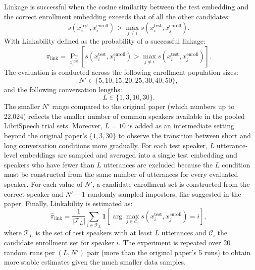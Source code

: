 \documentclass[12pt,leqno,a4paper]{article}
\begin{document}
Linkage is successful when the cosine similarity between the test embedding
and the correct enrollment embedding exceeds that of all the other candidates:
\begin{equation}
s(x_i^{\mathrm{test}}, x_i^{\mathrm{enroll}})
> \max_{j \neq i} s(x_i^{\mathrm{test}}, x_j^{\mathrm{enroll}}).
\end{equation}
With Linkability defined as the probability of a successful linkage:
\begin{equation}
\pi_{\mathrm{link}} = \Pr_{x_i^{\mathrm{test}}}
\left[
s(x_i^{\mathrm{test}}, x_i^{\mathrm{enroll}})
> \max_{j \neq i} s(x_i^{\mathrm{test}}, x_j^{\mathrm{enroll}})
\right].
\end{equation}
The evaluation is conducted across the following enrollment population sizes:
\begin{equation}
N' \in \{5, 10, 15, 20, 25, 30, 40, 50\},
\end{equation}
and the following conversation lengths:
\begin{equation}
L \in \{1, 3, 10, 30\}.
\end{equation}
The smaller $N'$ range compared to
the original paper (which numbers up to 22,024) reflects the smaller number of common
speakers available in the pooled LibriSpeech trial sets. Moreover, $L=10$
is added as an intermediate setting beyond the original paper's
$\{1, 3, 30\}$ to observe the transition between short and long
conversation conditions more gradually. For each test speaker, $L$
utterance-level embeddings are sampled and averaged
into a single test embedding and speakers who have fewer than $L$
utterances are excluded because the $L$ condition must be constructed from the same number of utterances for every evaluated speaker. For each value of $N'$, a candidate enrollment set
is constructed from the correct speaker and $N'-1$ randomly sampled
impostors, like suggested in the paper. Finally, Linkability is estimated as:
\begin{equation}
\widehat{\pi}_{\mathrm{link}}
= \frac{1}{|\mathcal{T}_L|}
\sum_{i \in \mathcal{T}_L}
\mathbf{1}
\left[
\arg\max_{j \in \mathcal{C}_i}
s(x_i^{\mathrm{test}}, x_j^{\mathrm{enroll}})
= i
\right],
\end{equation}
where $\mathcal{T}_L$ is the set of test speakers with at least $L$
utterances and $\mathcal{C}_i$ the candidate enrollment set for speaker
$i$. The experiment is repeated over 20 random runs per $(L, N')$
pair (more than the original paper's 5 runs) to obtain more stable
estimates given the much smaller data samples.
\end{document}
